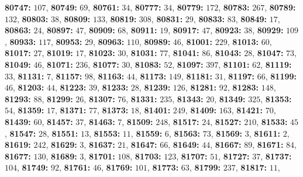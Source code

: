\textsf{\bfseries 80747:} $107$, \textsf{\bfseries 80749:} $69$, \textsf{\bfseries 80761:} $34$, \textsf{\bfseries 80777:} $34$, \textsf{\bfseries 80779:} $172$, \textsf{\bfseries 80783:} $267$, \textsf{\bfseries 80789:} $132$, \textsf{\bfseries 80803:} $38$, \textsf{\bfseries 80809:} $133$, \textsf{\bfseries 80819:} $308$, \textsf{\bfseries 80831:} $29$, \textsf{\bfseries 80833:} $83$, \textsf{\bfseries 80849:} $17$, \textsf{\bfseries 80863:} $24$, \textsf{\bfseries 80897:} $47$, \textsf{\bfseries 80909:} $68$, \textsf{\bfseries 80911:} $19$, \textsf{\bfseries 80917:} $47$, \textsf{\bfseries 80923:} $38$, \textsf{\bfseries 80929:} $109$, \textsf{\bfseries 80933:} $117$, \textsf{\bfseries 80953:} $29$, \textsf{\bfseries 80963:} $110$, \textsf{\bfseries 80989:} $46$, \textsf{\bfseries 81001:} $229$, \textsf{\bfseries 81013:} $60$, \textsf{\bfseries 81017:} $27$, \textsf{\bfseries 81019:} $17$, \textsf{\bfseries 81023:} $30$, \textsf{\bfseries 81031:} $77$, \textsf{\bfseries 81041:} $86$, \textsf{\bfseries 81043:} $28$, \textsf{\bfseries 81047:} $73$, \textsf{\bfseries 81049:} $46$, \textsf{\bfseries 81071:} $236$, \textsf{\bfseries 81077:} $30$, \textsf{\bfseries 81083:} $52$, \textsf{\bfseries 81097:} $397$, \textsf{\bfseries 81101:} $62$, \textsf{\bfseries 81119:} $33$, \textsf{\bfseries 81131:} $7$, \textsf{\bfseries 81157:} $98$, \textsf{\bfseries 81163:} $44$, \textsf{\bfseries 81173:} $149$, \textsf{\bfseries 81181:} $31$, \textsf{\bfseries 81197:} $66$, \textsf{\bfseries 81199:} $46$, \textsf{\bfseries 81203:} $44$, \textsf{\bfseries 81223:} $39$, \textsf{\bfseries 81233:} $28$, \textsf{\bfseries 81239:} $126$, \textsf{\bfseries 81281:} $92$, \textsf{\bfseries 81283:} $148$, \textsf{\bfseries 81293:} $88$, \textsf{\bfseries 81299:} $26$, \textsf{\bfseries 81307:} $76$, \textsf{\bfseries 81331:} $235$, \textsf{\bfseries 81343:} $20$, \textsf{\bfseries 81349:} $325$, \textsf{\bfseries 81353:} $54$, \textsf{\bfseries 81359:} $17$, \textsf{\bfseries 81371:} $77$, \textsf{\bfseries 81373:} $18$, \textsf{\bfseries 81401:} $249$, \textsf{\bfseries 81409:} $163$, \textsf{\bfseries 81421:} $70$, \textsf{\bfseries 81439:} $60$, \textsf{\bfseries 81457:} $37$, \textsf{\bfseries 81463:} $7$, \textsf{\bfseries 81509:} $248$, \textsf{\bfseries 81517:} $24$, \textsf{\bfseries 81527:} $210$, \textsf{\bfseries 81533:} $45$, \textsf{\bfseries 81547:} $28$, \textsf{\bfseries 81551:} $13$, \textsf{\bfseries 81553:} $11$, \textsf{\bfseries 81559:} $6$, \textsf{\bfseries 81563:} $73$, \textsf{\bfseries 81569:} $3$, \textsf{\bfseries 81611:} $2$, \textsf{\bfseries 81619:} $242$, \textsf{\bfseries 81629:} $3$, \textsf{\bfseries 81637:} $21$, \textsf{\bfseries 81647:} $66$, \textsf{\bfseries 81649:} $44$, \textsf{\bfseries 81667:} $89$, \textsf{\bfseries 81671:} $84$, \textsf{\bfseries 81677:} $130$, \textsf{\bfseries 81689:} $3$, \textsf{\bfseries 81701:} $108$, \textsf{\bfseries 81703:} $123$, \textsf{\bfseries 81707:} $51$, \textsf{\bfseries 81727:} $37$, \textsf{\bfseries 81737:} $104$, \textsf{\bfseries 81749:} $92$, \textsf{\bfseries 81761:} $46$, \textsf{\bfseries 81769:} $101$, \textsf{\bfseries 81773:} $63$, \textsf{\bfseries 81799:} $237$, \textsf{\bfseries 81817:} $11$, 
